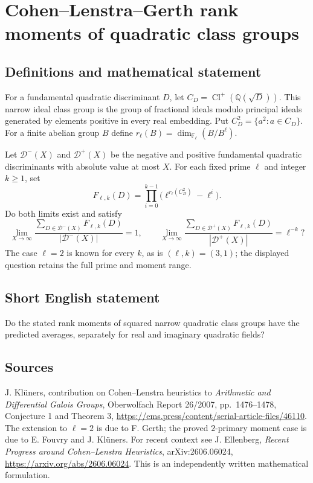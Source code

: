 \documentclass{article}
\begin{document}
\section*{Cohen--Lenstra--Gerth rank moments of quadratic class groups}
\subsection{Definitions and mathematical statement}
For a fundamental quadratic discriminant $D$, let
$C_D=\operatorname{Cl}^+(\mathbb Q(\sqrt D))$. This narrow ideal class group
is the group of fractional ideals modulo principal ideals generated by
elements positive in every real embedding. Put $C_D^2=\{a^2:a\in C_D\}$.
For a finite abelian group $B$ define
$r_\ell(B)=\dim_{\mathbb F_\ell}(B/B^\ell)$.

Let $\mathcal D^-(X)$ and $\mathcal D^+(X)$ be the negative and positive
fundamental quadratic discriminants with absolute value at most $X$.
For each fixed prime $\ell$ and integer $k\geq1$, set
\[
 F_{\ell,k}(D)=\prod_{i=0}^{k-1}
     \bigl(\ell^{r_\ell(C_D^2)}-\ell^i\bigr).
\]
Do both limits exist and satisfy
\[
 \lim_{X\to\infty}\frac{\sum_{D\in\mathcal D^-(X)}F_{\ell,k}(D)}
 {|\mathcal D^-(X)|}=1,\qquad
 \lim_{X\to\infty}\frac{\sum_{D\in\mathcal D^+(X)}F_{\ell,k}(D)}
 {|\mathcal D^+(X)|}=\ell^{-k}?
\]
The case $\ell=2$ is known for every $k$, as is $(\ell,k)=(3,1)$;
the displayed question retains the full prime and moment range.

\subsection{Short English statement}
Do the stated rank moments of squared narrow quadratic class groups have
the predicted averages, separately for real and imaginary quadratic fields?

\subsection{Sources}
J. Kl\"uners, contribution on Cohen--Lenstra heuristics to
\emph{Arithmetic and Differential Galois Groups}, Oberwolfach Report
26/2007, pp.\ 1476--1478, Conjecture 1 and Theorem 3,
\url{https://ems.press/content/serial-article-files/46110}.
The extension to $\ell=2$ is due to F. Gerth; the proved $2$-primary moment
case is due to E. Fouvry and J. Kl\"uners.
For recent context see J. Ellenberg, \emph{Recent Progress around
Cohen--Lenstra Heuristics}, arXiv:2606.06024,
\url{https://arxiv.org/abs/2606.06024}.
This is an independently written mathematical formulation.
\end{document}
